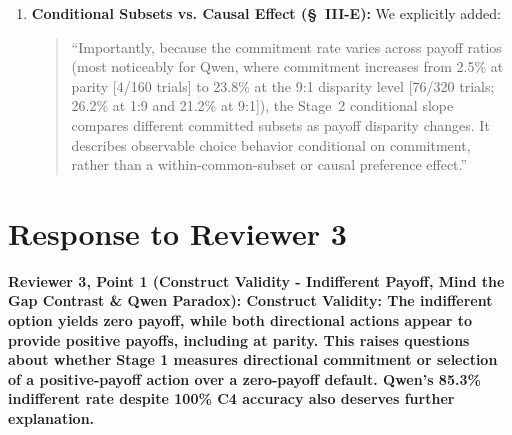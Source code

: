 \documentclass[11pt]{article}
\newcommand{\reviewercomment}[1]{\vspace{1em}\noindent\textbf{\textcolor{commentcolor}{#1}}}
\newcommand{\quotechange}[1]{\vspace{0.5em}\begin{quote}\small\textcolor{quotecolor}{``#1''}\end{quote}}
\begin{document}
\begin{enumerate}[leftmargin=*]
\begin{itemize}
  \item \textit{Bounding Sensitivity}: Extreme-case imputation (treating all excluded non-parity responses as either all non-dominant or all dominant) yields narrow intervals: Llama spans $[72.00\%, 76.25\%]$ (vs.\ 75.19\% base, $\Delta \in [-3.19\%, +1.06\%]$); Phi spans $[73.33\%, 75.00\%]$ (vs.\ 74.57\% base, $\Delta \in [-1.24\%, +0.43\%]$).
  \end{itemize}
  Across both models and methods, the maximum swing is minimal ($\le 3.2$ percentage points), showing that parse exclusions cannot explain model behavior.
\item \textbf{Conditional Subsets vs. Causal Effect (\S~III-E):} We explicitly added:
\quotechange{Importantly, because the commitment rate varies across payoff ratios (most noticeably for Qwen, where commitment increases from 2.5\% at parity [4/160 trials] to 23.8\% at the 9:1 disparity level [76/320 trials; 26.2\% at 1:9 and 21.2\% at 9:1]), the Stage~2 conditional slope compares different committed subsets as payoff disparity changes. It describes observable choice behavior conditional on commitment, rather than a within-common-subset or causal preference effect.}
\end{enumerate}

\section*{Response to Reviewer 3}

\reviewercomment{Reviewer 3, Point 1 (Construct Validity - Indifferent Payoff, Mind the Gap Contrast \& Qwen Paradox): Construct Validity: The indifferent option yields zero payoff, while both directional actions appear to provide positive payoffs, including at parity. This raises questions about whether Stage 1 measures directional commitment or selection of a positive-payoff action over a zero-payoff default. Qwen's 85.3\% indifferent rate despite 100\% C4 accuracy also deserves further explanation.}
\end{document}
